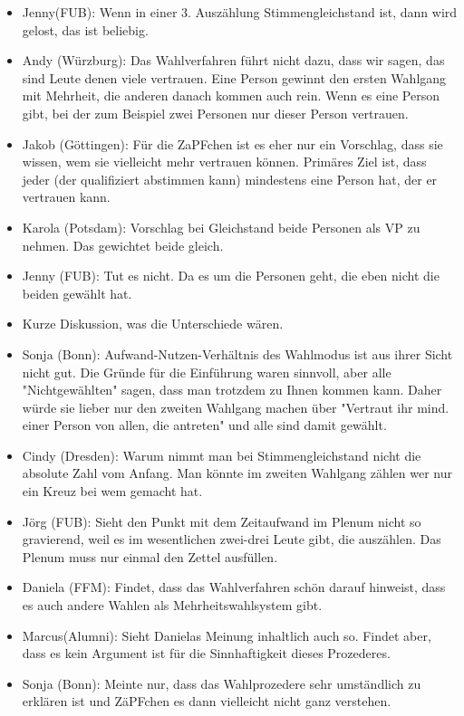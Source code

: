 \begin{itemize}
        \item Jenny(FUB): Wenn in einer 3. Auszählung Stimmengleichstand ist, dann wird gelost, das ist beliebig.
        \item Andy (Würzburg): Das Wahlverfahren führt nicht dazu, dass wir sagen, das sind Leute denen viele vertrauen. Eine Person gewinnt den ersten Wahlgang mit Mehrheit, die anderen danach kommen auch rein. Wenn es eine Person gibt, bei der zum Beispiel zwei Personen nur dieser Person vertrauen.
        \item Jakob (Göttingen): Für die ZaPFchen ist es eher nur ein Vorschlag, dass sie wissen, wem sie vielleicht mehr vertrauen können. Primäres Ziel ist, dass jeder (der qualifiziert abstimmen kann) mindestens eine Person hat, der er vertrauen kann.
        \item Karola (Potsdam): Vorschlag bei Gleichstand beide Personen als VP zu nehmen. Das gewichtet beide gleich.
        \item Jenny (FUB): Tut es nicht. Da es um die Personen geht, die eben nicht die beiden gewählt hat.
        \item Kurze Diskussion, was die Unterschiede wären.
        \item Sonja (Bonn): Aufwand-Nutzen-Verhältnis des Wahlmodus ist aus ihrer Sicht nicht gut. Die Gründe für die Einführung waren sinnvoll, aber alle "Nichtgewählten" sagen, dass man trotzdem zu Ihnen kommen kann. Daher würde sie lieber nur den zweiten Wahlgang machen über "Vertraut ihr mind. einer Person von allen, die antreten" und alle sind damit gewählt.
        \item Cindy (Dresden): Warum nimmt man bei Stimmengleichstand nicht die absolute Zahl vom Anfang. Man könnte im zweiten Wahlgang zählen wer nur ein Kreuz bei wem gemacht hat.
        \item Jörg (FUB): Sieht den Punkt mit dem Zeitaufwand im Plenum nicht so gravierend, weil es im wesentlichen zwei-drei Leute gibt, die auszählen. Das Plenum muss nur einmal den Zettel ausfüllen.
        \item Daniela (FFM): Findet, dass das Wahlverfahren schön darauf hinweist, dass es auch andere Wahlen als Mehrheitswahlsystem gibt.
        \item Marcus(Alumni): Sieht Danielas Meinung inhaltlich auch so. Findet aber, dass es kein Argument ist für die Sinnhaftigkeit dieses Prozederes.
        \item Sonja (Bonn): Meinte nur, dass das Wahlprozedere sehr umständlich zu erklären ist und ZäPFchen es dann vielleicht nicht ganz verstehen.

\end{itemize}
